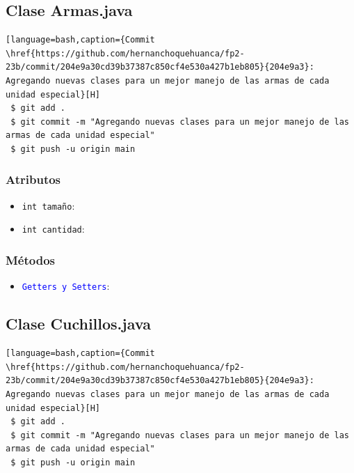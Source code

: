 \documentclass{article}
\begin{document}

\newpage
\subsection{Clase Armas.java}
\begin{lstlisting}[language=bash,caption={Commit \href{https://github.com/hernanchoquehuanca/fp2-23b/commit/204e9a30cd39b37387c850cf4e530a427b1eb805}{204e9a3}: Agregando nuevas clases para un mejor manejo de las armas de cada unidad especial}[H]
 $ git add .
 $ git commit -m "Agregando nuevas clases para un mejor manejo de las armas de cada unidad especial"			
 $ git push -u origin main
\end{lstlisting}

\subsubsection{Atributos}
\begin{itemize}
    \item \texttt{int tamaño}: 
    \item \texttt{int cantidad}: 
\end{itemize}


\subsubsection{Métodos}
\begin{itemize}
    \item \texttt{\textcolor{blue}{Getters y Setters}}: 
\end{itemize}



\newpage
\subsection{Clase Cuchillos.java}
\begin{lstlisting}[language=bash,caption={Commit \href{https://github.com/hernanchoquehuanca/fp2-23b/commit/204e9a30cd39b37387c850cf4e530a427b1eb805}{204e9a3}: Agregando nuevas clases para un mejor manejo de las armas de cada unidad especial}[H]
 $ git add .
 $ git commit -m "Agregando nuevas clases para un mejor manejo de las armas de cada unidad especial"			
 $ git push -u origin main
\end{lstlisting}
\end{document}
